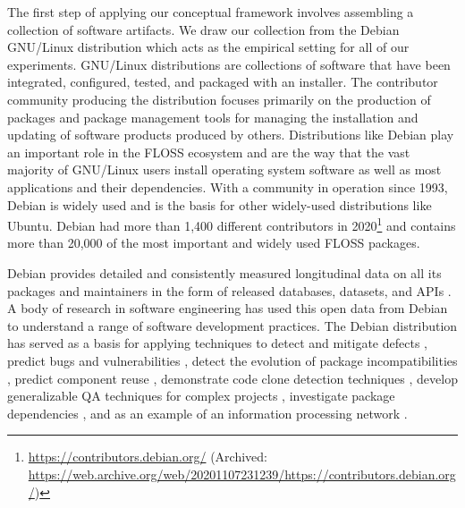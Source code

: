 \documentclass[10pt,conference]{IEEEtran}\usepackage[]{graphicx}\usepackage[usenames,dvipsnames]{color}
\begin{document}
The first step of applying our conceptual framework involves assembling a collection of software artifacts. We draw our collection from the Debian GNU/Linux distribution which acts as the empirical setting for all of our experiments. GNU/Linux distributions are collections of software that have been integrated, configured, tested, and packaged with an installer. The contributor community producing the distribution focuses primarily on the production of packages and package management tools for managing the installation and updating of software products produced by others. Distributions like Debian play an important role in the FLOSS ecosystem and are the way that the vast majority of GNU/Linux users install operating system software as well as most applications and their dependencies. 
With a community in operation since 1993, Debian is widely used and is the basis for other widely-used distributions like Ubuntu. Debian had more than 1,400 different contributors in 2020\footnote{\url{https://contributors.debian.org/} (Archived: \url{https://web.archive.org/web/20201107231239/https://contributors.debian.org/})} and contains more than 20,000 of the most important and widely used FLOSS packages.%

Debian provides detailed and consistently measured longitudinal data on all its packages and maintainers in the form of released databases, datasets, and APIs \cite{caneill_debsources_2016, nussbaum_ultimate_2010, hindle_mining_2010}. 
A body of research in software engineering has used this open data from Debian to understand a range of software development practices. The Debian distribution has served as a basis for applying techniques to detect and mitigate defects \cite{chen_large-scale_2007, michlmayr_statistical_2006}, 
predict bugs and vulnerabilities \cite{pati_comparison_2014},
 detect the evolution of package incompatibilities \cite{claes_historical_2015}, 
predict component reuse \cite{spaeth_lightweight_2008}, demonstrate code clone detection techniques \cite{cordy_debcheck_2011},
develop generalizable QA techniques for complex projects \cite{nussbaum_ultimate_2010},
investigate package dependencies \cite{galindo_duarte_debian_2010}, and as an example of an information processing network \cite{villegas_evolution_2020}. 
\end{document}
